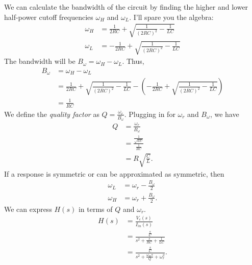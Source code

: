 \documentclass[nobib]{tufte-handout}
\begin{document}
We can calculate the bandwidth 
of the circuit by finding 
the higher and lower half-power 
cutoff frequencies
$\omega_H$ and 
$\omega_L$. 
I'll spare you the algebra:
\begin{align}
    \omega_H &= \frac{1}{2RC} + \sqrt{\frac{1}{(2RC)^2} - \frac{1}{LC}}\\
    \omega_L &= -\frac{1}{2RC} + \sqrt{\frac{1}{(2RC)^2} - \frac{1}{LC}}
\end{align}
The bandwidth 
will be $B_{\omega} = \omega_H - \omega_L$.
Thus, 
\begin{align}
    B_{\omega} &= \omega_H - \omega_L \\
    &= \frac{1}{2RC} + \sqrt{\frac{1}{(2RC)^2} - \frac{1}{LC}} - \left(-\frac{1}{2RC} + \sqrt{\frac{1}{(2RC)^2} - \frac{1}{LC}}\right) \\
    &= \frac{1}{RC}
\end{align}
We define the \emph{quality
factor} as $Q = \frac{\omega_r}{B_{\omega}}$.
Plugging in for $\omega_r$ and 
$B_{\omega}$, we have 
\begin{align}
    Q &= \frac{\omega_r}{B_{\omega}} \\
    &= \frac{\frac{1}{\sqrt{LC}}}{\frac{1}{RC}} \\
    &= R\sqrt{\frac{C}{L}}.
\end{align}
If a response is symmetric or can be approximated as
symmetric, then 
\begin{align}
    \omega_L &= \omega_r - \frac{B_{\omega}}{2} \\
    \omega_H &= \omega_r + \frac{B_{\omega}}{2}.
\end{align}
We can express $H(s)$ in terms of 
$Q$ and $\omega_r$. 
\begin{align}
    H(s) &= \frac{V_c(s)}{I_{in}(s)} \\
    &= \frac{\frac{s}{C}}{s^2 + \frac{s}{RC} + \frac{1}{LC}} \\
    &= \frac{\frac{s}{C}}{s^2 + \frac{\omega_m s}{Q} + \omega^2_r}.
\end{align}
\end{document}
